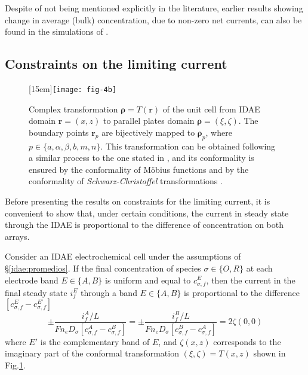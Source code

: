 Despite of not being mentioned explicitly in the literature,
earlier results showing change in average (bulk) concentration, due to non-zero net currents,
can also be found in the simulations of \cite[Fig. 5 and Eq. (4) with boundary conditions for coplanar electrodes]{Strutwolf:2005:feb}.


\subsection{Constraints on the limiting current}

\begin{figure}[t]
	\centering
	{\texttt{[image: fig-4b]}}  %
	\caption{
		Complex transformation $\bm{\rho} = T(\bm{r})$ of the unit cell
		from IDAE domain $\bm{r} = (x,z)$
		to parallel plates domain $\bm{\rho} = (\xi, \zeta)$.
		The boundary points $\bm{r}_{p}$ are bijectively mapped to $\bm{\rho}_{p}$,
		where $p \in \{a, \alpha, \beta, b, m, n\}$.
		This transformation can be obtained following a similar process to the one stated in \cite{Aoki:1988:dec},
		and its conformality is ensured by the conformality of Möbius functions \cite[\S5.7]{Ablowitz:2003:apr}
		and by the conformality of \emph{Schwarz-Christoffel} transformations \cite[Theorem 5.6.1]{Ablowitz:2003:apr}.
	}
	\label{idae:fig:cell:transformation}
\end{figure}

Before presenting the results on constraints for the limiting current,
it is convenient to show that, under certain conditions,
the current in steady state through the IDAE is proportional to the difference of concentration on both arrays.

\begin{lema}
	\label{idae:lem:if}
	Consider an IDAE electrochemical cell under the assumptions of \S\ref{idae:promedios}.
	If the final concentration of species $\sigma \in \{O,R\}$ at each electrode band $E \in \{A,B\}$ is uniform and equal to $c_{\sigma,f}^{E}$,
	then the current in the final steady state $i_{f}^{E}$
	through a band $E \in \{A,B\}$ is proportional to the difference $[c_{\sigma,f}^{E} - c_{\sigma,f}^{E'}]$
	\begin{equation}
		\label{idae:eqn:if}
		\pm \frac{
			i_{f}^{A}/L
		}{
			F n_{e} D_{\sigma} [c_{\sigma,f}^{A} - c_{\sigma,f}^{B}]
		}
		= \pm \frac{
			i_{f}^{B}/L
		}{
			F n_{e} D_{\sigma} [c_{\sigma,f}^{B} - c_{\sigma,f}^{A}]
		}
		= 2 \zeta(0,0)
	\end{equation}
	where $E'$ is the complementary band of $E$,
	and $\zeta(x,z)$ corresponds to the imaginary part of the conformal transformation $(\xi,\zeta) = T(x,z)$ shown in Fig.\ref{idae:fig:cell:transformation}.
\end{lema}

